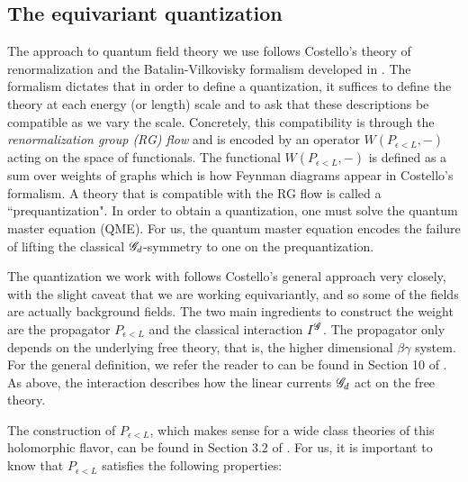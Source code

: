 \subsection{The equivariant quantization}

The approach to quantum field theory we use follows Costello's theory of renormalization and the Batalin-Vilkovisky formalism developed in \cite{CosRenorm}.
The formalism dictates that in order to define a quantization, it suffices to define the theory at each energy (or length) scale and to ask that these descriptions be compatible as we vary the scale.
Concretely, this compatibility is through the {\em renormalization group (RG) flow} and is encoded by an operator $W(P_{\epsilon < L}, -)$ acting on the space of functionals. 
The functional $W(P_{\epsilon < L},-)$ is defined as a sum over weights of graphs which is how Feynman diagrams appear in Costello's formalism.
A theory that is compatible with the RG flow is called a ``prequantization". 
In order to obtain a quantization, one must solve the quantum master equation (QME). 
For us, the quantum master equation encodes the failure of lifting the classical $\mathscr G_d$-symmetry to one on the prequantization.

The quantization we work with follows Costello's general approach very closely, with the slight caveat that we are working equivariantly, and so some of the fields are actually background fields. 
The two main ingredients to construct the weight are the propagator $P_{\epsilon < L}$ and the classical interaction $I^{\mathscr G}$. 
The propagator only depends on the underlying free theory, that is, the higher dimensional $\beta\gamma$ system. 
For the general definition, we refer the reader to can be found in Section 10 of \cite{CG2}.
As above, the interaction describes how the linear currents $\mathscr G_d$ act on the free theory. 

The construction of $P_{\epsilon<L}$, which makes sense for a wide class theories of this holomorphic flavor, can be found in Section 3.2 of \cite{BWhol}.
For us, it is important to know that $P_{\epsilon<L}$ satisfies the following properties:

